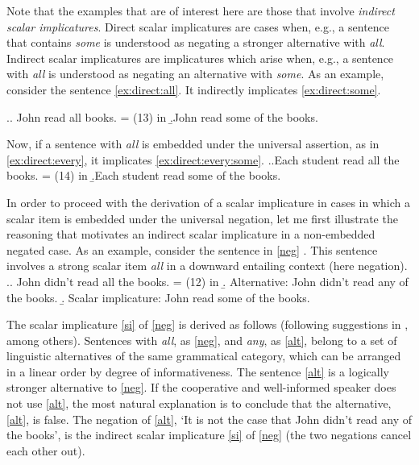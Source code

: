 Note that the examples that are of interest here are those that involve \textit{indirect scalar implicatures}. Direct scalar implicatures are cases when, e.g., a sentence that contains \textit{some} is understood as negating a stronger alternative with \textit{all}. Indirect scalar implicatures are implicatures which arise when, e.g., a sentence with \textit{all} is understood as negating an alternative with \textit{some}. As an example, consider the sentence \ref{ex:direct:all}. It indirectly implicates \ref{ex:direct:some}.

\ex.\a. \label{ex:direct:all}John read all books. \hfill = (13) in \citealt{Chemla:09}
\b.\label{ex:direct:some}John read some of the books.

Now, if a sentence with \textit{all} is embedded under the universal assertion, as in \ref{ex:direct:every}, it implicates \ref{ex:direct:every:some}.
\ex.\a.\label{ex:direct:every}Each student read all the books. \hfill = (14) in \citealt{Chemla:09}
\b.\label{ex:direct:every:some}Each student read some of the books.

In order to proceed with the derivation of a scalar implicature in cases in which a scalar item is embedded under the universal negation, let me first illustrate the reasoning that motivates an indirect scalar implicature in a non-embedded negated case. As an example, consider the sentence in \ref{neg} \citep[taken from][]{Chemla:09}. This sentence involves a strong scalar item \textit{all} in a downward entailing context   (here negation).
\ex.\a. \label{neg} John didn't read all the books. \hfill = (12) in \citealt{Chemla:09}
\b. \label{alt} Alternative: John didn't read any of the books.
\b. \label{si} Scalar implicature: John read some of the books.

The scalar implicature \ref{si} of \ref{neg} is derived as follows (following suggestions in \citealp{Grice:75, Ducrot:69, Horn:72}, among others). Sentences with \textit{all}, as \ref{neg}, and \textit{any}, as \ref{alt}, belong to a set of linguistic alternatives of the same grammatical category, which can be arranged in a linear order by degree of informativeness. The sentence \ref{alt} is a logically stronger alternative to \ref{neg}. If the cooperative and well-informed speaker does not use \ref{alt}, the most natural explanation is to conclude that the alternative, \ref{alt}, is false. The negation of \ref{alt}, `It is not the case that John didn't read any of the books', is the indirect scalar implicature \ref{si} of \ref{neg} (the two negations cancel each other out).

